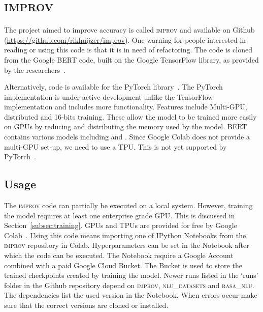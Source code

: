 \chapter{\textsc{improv}}
\label{ch:improv}
The project aimed to improve accuracy is called \textsc{improv} and available on Github (\url{https://github.com/rikhuijzer/improv}).
One warning for people interested in reading or using this code is that it is in need of refactoring.
The code is cloned from the Google BERT code, built on the Google TensorFlow library, as provided by the researchers~\citep{devlin2018github}.

Alternatively, code is available for the PyTorch library~\citep{wolf2018github}.
The PyTorch implementation is under active development unlike the TensorFlow implementation and includes more functionality.
Features include Multi-GPU, distributed and 16-bits training.
These allow the model to be trained more easily on GPUs by reducing and distributing the memory used by the model.
BERT contains various models including  and .
Since Google Colab does not provide a multi-GPU set-up, we need to use a TPU.
This is not yet supported by PyTorch~\citep{wolf2018github}.

\section{Usage}
\label{sec:improv_usage}
The \textsc{improv} code can partially be executed on a local system.
However, training the model requires at least one enterprise grade GPU.
This is discussed in Section~\ref{subsec:training}.
GPUs and TPUs are provided for free by Google Colab~\citep{google2019colab}.
Using this code means importing one of IPython Notebooks from the \textsc{improv} repository in Colab.
Hyperparameters can be set in the Notebook after which the code can be executed.
The Notebook require a Google Account combined with a paid Google Cloud Bucket.
The Bucket is used to store the trained checkpoints created by training the model.
Newer runs listed in the `runs' folder in the Github repository depend on \textsc{improv}, \textsc{nlu\_datasets} and \textsc{rasa\_nlu}.
The dependencies list the used version in the Notebook.
When errors occur make sure that the correct versions are cloned or installed.

\iffalse
\section{Overview}
\label{sec:improv_overview}
Since the code is in need of refactoring this section will only describe the most important parts of the project.

\fi

